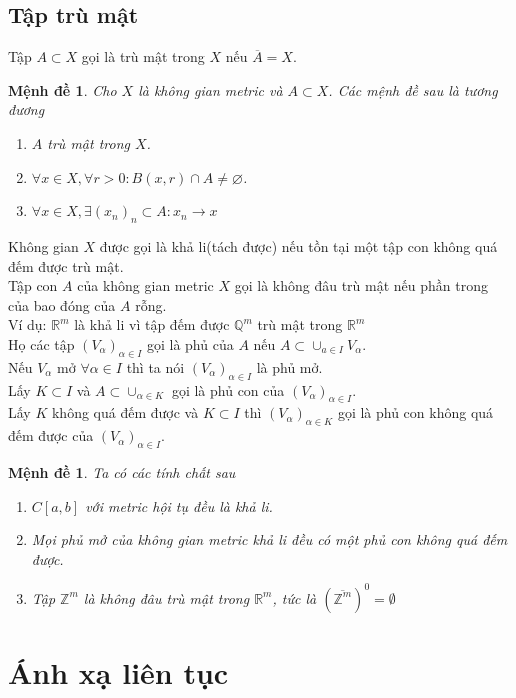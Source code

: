 \documentclass[a4paper, 12pt]{article}
\newtheorem{proposition}[theorem]{Mệnh đề}
\newcommand{\xd}{\\[7pt]}
\begin{document}
\subsection{Tập trù mật}
Tập $A \subset X$ gọi là trù mật trong $X$ nếu $\overline{A}=X$.
\begin{proposition}
Cho $X$ là không gian metric và $A \subset X$. Các mệnh đề sau là tương đương
\begin{enumerate}
    \item $A$ trù mật trong $X$.
    \item $\forall x \in X, \forall r>0: B(x,r) \cap A \neq \varnothing$.
    \item $\forall x \in X, \exists (x_n)_n \subset A: x_n \rightarrow x$
\end{enumerate}
\end{proposition}
Không gian $X$ được gọi là khả li(tách được) nếu tồn tại một tập con không quá đếm được trù mật.\\[7pt]
Tập con $A$ của không gian metric $X$ gọi là không đâu trù mật nếu phần trong của bao đóng của $A$ rỗng.\\[7pt]
Ví dụ: $\mathbb{R}^m$ là khả li vì tập đếm được $\mathbb{Q} ^m$ trù mật trong $\mathbb{R}^m$\\[7pt]
Họ các tập $(V_\alpha)_{\alpha \in I}$ gọi là phủ của $A$ nếu $A \subset \cup_{a\in I}V_\alpha$.\xd
Nếu $V_\alpha$ mở $\forall \alpha \in I$ thì ta nói $(V_\alpha)_{\alpha \in I}$ là phủ mở.\xd
Lấy $K \subset I$ và $A \subset \cup_{\alpha \in K}$ gọi là phủ con của  $(V_\alpha)_{\alpha \in I}$.\xd
Lấy $K$ không quá đếm được  và $K\subset I$ thì $(V_\alpha)_{\alpha \in K}$ gọi là phủ con không quá đếm được của $(V_\alpha)_{\alpha \in I}$.

\begin{proposition}
Ta có các tính chất sau
\begin{enumerate}
    \item $C[a,b]$ với metric hội tụ đều là khả li.
    \item Mọi phủ mở của không gian metric khả li đều có một phủ con không quá đếm được.
    \item Tập $\mathbb{Z}^m$ là không đâu trù mật trong $\mathbb{R}^m$, tức là $(\overline{\mathbb{Z}^m})^0 = \emptyset$ 
\end{enumerate}
\end{proposition}
\newpage
\section{Ánh xạ liên tục}
\end{document}

